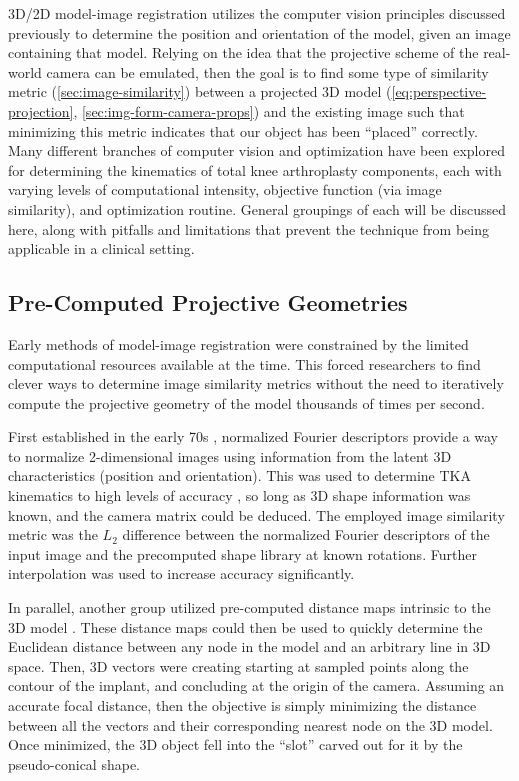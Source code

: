 3D/2D model-image registration utilizes the computer vision principles discussed previously to determine the position and orientation of the model, given an image containing that model.
Relying on the idea that the projective scheme of the real-world camera can be emulated, then the goal is to find some type of similarity metric (\cref{sec:image-similarity}) between a projected 3D model (\cref{eq:perspective-projection}, \cref{sec:img-form-camera-props}) and the existing image such that minimizing this metric indicates that our object has been ``placed'' correctly.
Many different branches of computer vision and optimization have been explored for determining the kinematics of total knee arthroplasty components, each with varying levels of computational intensity, objective function (via image similarity), and optimization routine.
General groupings of each will be discussed here, along with pitfalls and limitations that prevent the technique from being applicable in a clinical setting.

\subsection{Pre-Computed Projective Geometries}
Early methods of model-image registration were constrained by the limited computational resources available at the time.
This forced researchers to find clever ways to determine image similarity metrics without the need to iteratively compute the projective geometry of the model thousands of times per second.

First established in the early 70s \cite{wallaceAnalysisThreedimensionalMovement1980,richardIdentificationThreeDimensionalObjects1974,persoonShapeDiscriminationUsing1977,wallaceEfficientThreedimensionalAircraft1980}, normalized Fourier descriptors provide a way to normalize 2-dimensional images using information from the latent 3D characteristics (position and orientation).
This was used to determine TKA kinematics to high levels of accuracy \cite{banksModelBased3D1992,banksAccurateMeasurementThreedimensional1996}, so long as 3D shape information was known, and the camera matrix could be deduced.
The employed image similarity metric was the $L_2$ difference between the normalized Fourier descriptors of the input image and the precomputed shape library at known rotations.
Further interpolation was used to increase accuracy significantly.

In parallel, another group utilized pre-computed distance maps intrinsic to the 3D model \cite{lavalleeRecoveringPositionOrientation1995,zuffiModelbasedMethodReconstruction1999}.
These distance maps could then be used to quickly determine the Euclidean distance between any node in the model and an arbitrary line in 3D space.
Then, 3D vectors were creating starting at sampled points along the contour of the implant, and concluding at the origin of the camera.
Assuming an accurate focal distance, then the objective is simply minimizing the distance between all the vectors and their corresponding nearest node on the 3D model.
Once minimized, the 3D object fell into the ``slot'' carved out for it by the pseudo-conical shape.


